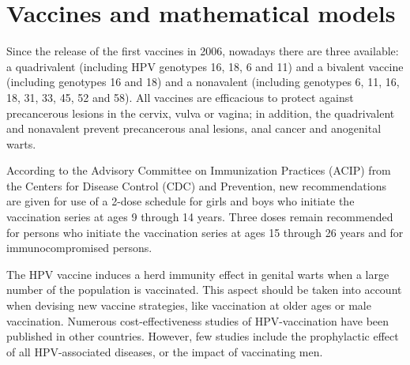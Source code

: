 \section{Vaccines and mathematical models}

Since the release of the first vaccines in 2006, nowadays there are three available: a quadrivalent (including HPV genotypes 16, 18, 6 and 11) and a bivalent vaccine (including genotypes 16 and 18) and a nonavalent (including genotypes 6, 11, 16, 18, 31, 33, 45, 52 and 58). All vaccines are efficacious to protect against precancerous lesions in the cervix, vulva or vagina; in addition, the quadrivalent and nonavalent prevent precancerous anal lesions, anal cancer and anogenital warts. 


According to the Advisory Committee on Immunization Practices (ACIP) from the Centers for Disease Control (CDC) and Prevention, new recommendations are given for use of a 2-dose schedule for girls and boys who initiate the vaccination series at ages 9 through 14 years. Three doses remain recommended for persons who initiate the vaccination series at ages 15 through 26 years and for immunocompromised persons.

The HPV vaccine induces a herd immunity effect in genital warts when a large number of the population is vaccinated. This aspect should be taken into account when devising new vaccine strategies, like vaccination at older ages or male vaccination. Numerous cost-effectiveness studies of HPV-vaccination have been published in other countries. However, few studies include the prophylactic effect of all HPV-associated diseases, or the impact of vaccinating men.


